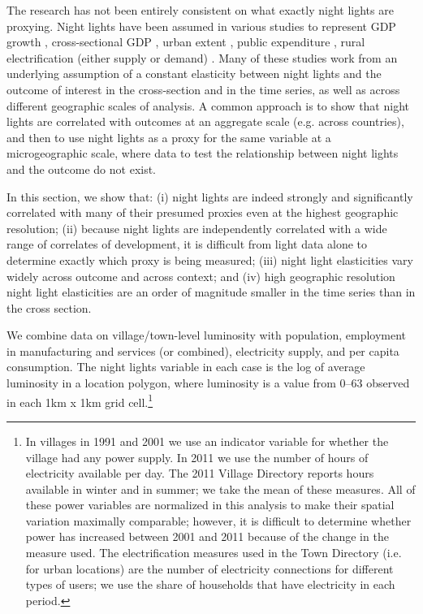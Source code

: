 \documentclass[12pt,letterpaper]{article}
\begin{document}
The research has not been entirely consistent on what exactly night
lights are proxying. Night lights have been assumed in various studies
to represent GDP growth \cite{henderson2009b}, cross-sectional GDP
\cite{bleakley2012}, urban extent \cite{harari2020,baum-snow2012},
public expenditure \cite{hodler2014}, rural electrification (either
supply or demand)
\cite{min2013,baskaran2015,burlig2016,mahadevan2020}. Many of these
studies work from an underlying assumption of a constant elasticity
between night lights and the outcome of interest in the cross-section
and in the time series, as well as across different geographic scales
of analysis. A common approach is to show that night lights are
correlated with outcomes at an aggregate scale (e.g. across
countries), and then to use night lights as a proxy for the same
variable at a microgeographic scale, where data to test the
relationship between night lights and the outcome do not exist.

In this section, we show that: (i) night lights are indeed strongly
and significantly correlated with many of their presumed proxies even
at the highest geographic resolution; (ii) because night lights are
independently correlated with a wide range of correlates of
development, it is difficult from light data alone to determine
exactly which proxy is being measured; (iii) night light elasticities
vary widely across outcome and across context; and (iv) high
geographic resolution night light elasticities are an order of
magnitude smaller in the time series than in the cross section.

We combine data on village/town-level luminosity with population,
employment in manufacturing and services (or combined), electricity
supply, and per capita consumption. The night lights variable in each
case is the log of average luminosity in a location polygon, where
luminosity is a value from 0--63 observed in each 1km x 1km grid
cell.\footnote{In villages in 1991 and 2001 we use an
  indicator variable for whether the village had any power supply. In
  2011 we use the number of hours of electricity available per
  day. The 2011 Village Directory reports hours available in winter and in
  summer; we take the mean of these measures. All of these power
  variables are normalized in this analysis to make their spatial
  variation maximally comparable; however, it is difficult to
  determine whether power has increased between 2001 and 2011 because
  of the change in the measure used. The electrification measures used
  in the Town Directory (i.e. for urban locations) are the number of
  electricity connections for different types of users; we use the
  share of households that have electricity in each period.}
\end{document}

